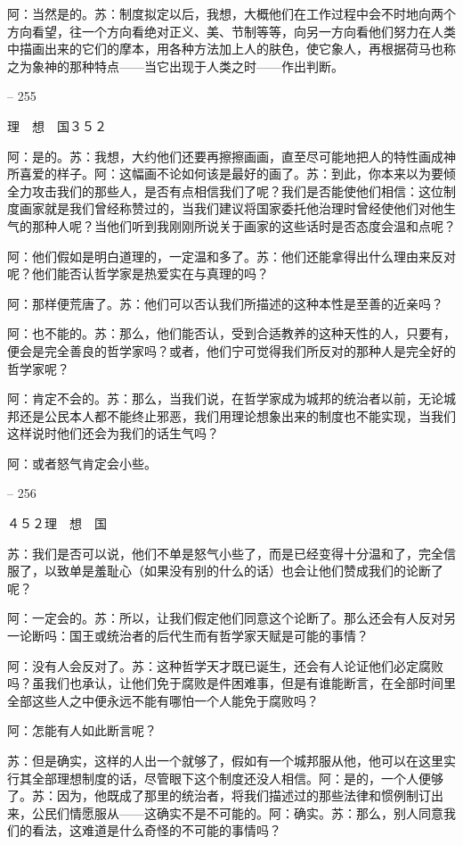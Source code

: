 \documentclass[11pt,oneside]{book}
\begin{document}
\begin{common-format}
    阿：当然是的。苏：制度拟定以后，我想，大概他们在工作过程中会不时地向两个方向看望，往一个方向看绝对正义、美、节制等等，向另一方向看他们努力在人类中描画出来的它们的摩本，用各种方法加上人的肤色，使它象人，再根据荷马也称之为象神的那种特点——当它出现于人类之时——作出判断。

    

-- 255

    理　想　国３５２

    阿：是的。苏：我想，大约他们还要再擦擦画画，直至尽可能地把人的特性画成神所喜爱的样子。阿：这幅画不论如何该是最好的画了。苏：到此，你本来以为要倾全力攻击我们的那些人，是否有点相信我们了呢？我们是否能使他们相信：这位制度画家就是我们曾经称赞过的，当我们建议将国家委托他治理时曾经使他们对他生气的那种人呢？当他们听到我刚刚所说关于画家的这些话时是否态度会温和点呢？

    阿：他们假如是明白道理的，一定温和多了。苏：他们还能拿得出什么理由来反对呢？他们能否认哲学家是热爱实在与真理的吗？

    阿：那样便荒唐了。苏：他们可以否认我们所描述的这种本性是至善的近亲吗？

    阿：也不能的。苏：那么，他们能否认，受到合适教养的这种天性的人，只要有，便会是完全善良的哲学家吗？或者，他们宁可觉得我们所反对的那种人是完全好的哲学家呢？

    阿：肯定不会的。苏：那么，当我们说，在哲学家成为城邦的统治者以前，无论城邦还是公民本人都不能终止邪恶，我们用理论想象出来的制度也不能实现，当我们这样说时他们还会为我们的话生气吗？

    阿：或者怒气肯定会小些。

    

-- 256

    ４５２理　想　国

    苏：我们是否可以说，他们不单是怒气小些了，而是已经变得十分温和了，完全信服了，以致单是羞耻心（如果没有别的什么的话）也会让他们赞成我们的论断了呢？

    阿：一定会的。苏：所以，让我们假定他们同意这个论断了。那么还会有人反对另一论断吗：国王或统治者的后代生而有哲学家天赋是可能的事情？

    阿：没有人会反对了。苏：这种哲学天才既已诞生，还会有人论证他们必定腐败吗？虽我们也承认，让他们免于腐败是件困难事，但是有谁能断言，在全部时间里全部这些人之中便永远不能有哪怕一个人能免于腐败吗？

    阿：怎能有人如此断言呢？

    苏：但是确实，这样的人出一个就够了，假如有一个城邦服从他，他可以在这里实行其全部理想制度的话，尽管眼下这个制度还没人相信。阿：是的，一个人便够了。苏：因为，他既成了那里的统治者，将我们描述过的那些法律和惯例制订出来，公民们情愿服从——这确实不是不可能的。阿：确实。苏：那么，别人同意我们的看法，这难道是什么奇怪的不可能的事情吗？


\end{common-format}
\end{document}
